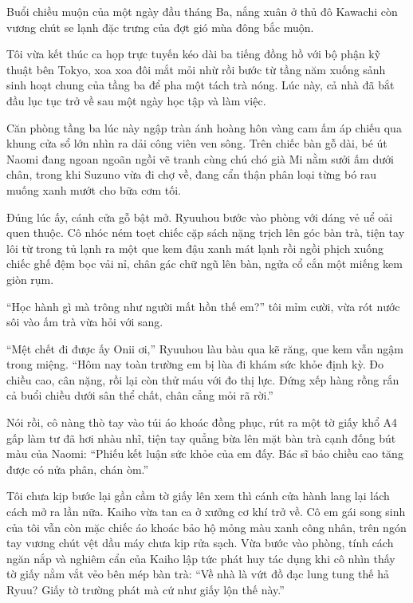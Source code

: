 ﻿\documentclass[../main.tex]{subfiles}
\begin{document}


Buổi chiều muộn của một ngày đầu tháng Ba, nắng xuân ở thủ đô Kawachi còn vương chút se lạnh đặc trưng của đợt gió mùa đông bắc muộn.

Tôi vừa kết thúc ca họp trực tuyến kéo dài ba tiếng đồng hồ với bộ phận kỹ thuật bên Tokyo, xoa xoa đôi mắt mỏi nhừ rồi bước từ tầng năm xuống sảnh sinh hoạt chung của tầng ba để pha một tách trà nóng. Lúc này, cả nhà đã bắt đầu lục tục trở về sau một ngày học tập và làm việc.

Căn phòng tầng ba lúc này ngập tràn ánh hoàng hôn vàng cam ấm áp chiếu qua khung cửa sổ lớn nhìn ra dải công viên ven sông. Trên chiếc bàn gỗ dài, bé út Naomi đang ngoan ngoãn ngồi vẽ tranh cùng chú chó già Mi nằm sưởi ấm dưới chân, trong khi Suzuno vừa đi chợ về, đang cẩn thận phân loại từng bó rau muống xanh mướt cho bữa cơm tối.

Đúng lúc ấy, cánh cửa gỗ bật mở. Ryuuhou bước vào phòng với dáng vẻ uể oải quen thuộc. Cô nhóc ném toẹt chiếc cặp sách nặng trịch lên góc bàn trà, tiện tay lôi từ trong tủ lạnh ra một que kem đậu xanh mát lạnh rồi ngồi phịch xuống chiếc ghế đệm bọc vải nỉ, chân gác chữ ngũ lên bàn, ngửa cổ cắn một miếng kem giòn rụm.

``Học hành gì mà trông như người mất hồn thế em?'' tôi mỉm cười, vừa rót nước sôi vào ấm trà vừa hỏi với sang.

``Mệt chết đi được ấy Onii ơi,'' Ryuuhou làu bàu qua kẽ răng, que kem vẫn ngậm trong miệng. ``Hôm nay toàn trường em bị lùa đi khám sức khỏe định kỳ. Đo chiều cao, cân nặng, rồi lại còn thử máu với đo thị lực. Đứng xếp hàng rồng rắn cả buổi chiều dưới sân thể chất, chân cẳng mỏi rã rời.''

Nói rồi, cô nàng thò tay vào túi áo khoác đồng phục, rút ra một tờ giấy khổ A4 gấp làm tư đã hơi nhàu nhĩ, tiện tay quẳng bừa lên mặt bàn trà cạnh đống bút màu của Naomi: ``Phiếu kết luận sức khỏe của em đấy. Bác sĩ bảo chiều cao tăng được có nửa phân, chán òm.''

Tôi chưa kịp bước lại gần cầm tờ giấy lên xem thì cánh cửa hành lang lại lách cách mở ra lần nữa. Kaiho vừa tan ca ở xưởng cơ khí trở về. Cô em gái song sinh của tôi vẫn còn mặc chiếc áo khoác bảo hộ mỏng màu xanh công nhân, trên ngón tay vương chút vệt dầu máy chưa kịp rửa sạch. Vừa bước vào phòng, tính cách ngăn nắp và nghiêm cẩn của Kaiho lập tức phát huy tác dụng khi cô nhìn thấy tờ giấy nằm vắt vẻo bên mép bàn trà: ``Về nhà là vứt đồ đạc lung tung thế hả Ryuu? Giấy tờ trường phát mà cứ như giấy lộn thế này.''
\end{document}

